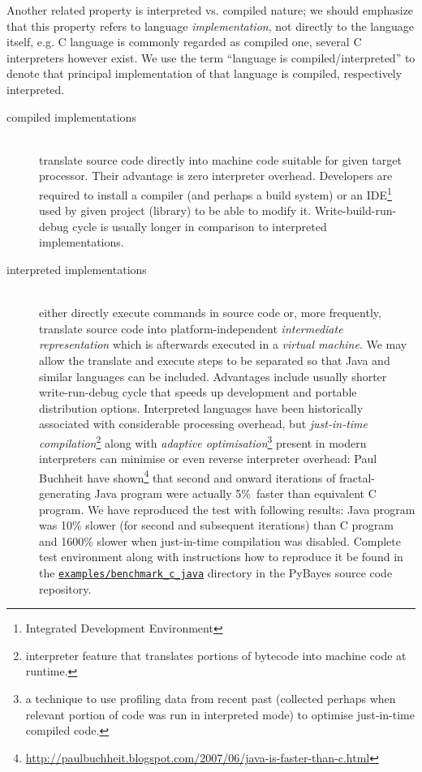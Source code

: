Another related property is interpreted vs. compiled nature; we should emphasize that this property
refers to language \emph{implementation}, not directly to the language itself, e.g. C language
is commonly regarded as compiled one, several C interpreters however exist. We use the term
``language is compiled/interpreted'' to denote that principal implementation of that language is
compiled, respectively interpreted.
\begin{description}
	\item[compiled implementations] \hfill \\
		translate source code directly into machine code suitable for given target processor. Their
		advantage is zero interpreter overhead. Developers are required to install a
		compiler (and perhaps a build system) or an IDE\footnote{Integrated Development Environment}
		used by given project (library) to be able to modify it. Write-build-run-debug cycle is
		usually longer in comparison to interpreted implementations.
	\item[interpreted implementations] \hfill \\
		either directly execute commands in source code or, more frequently, translate source code
		into platform-independent \emph{intermediate representation} which is afterwards executed in
		a \emph{virtual machine}. We may allow the translate and execute steps to be separated so that
		Java and similar languages can be included. Advantages include usually shorter
		write-run-debug cycle that speeds up development and portable distribution options.
		Interpreted languages have been historically associated with considerable processing
		overhead, but \emph{just-in-time compilation}\footnote{interpreter feature that translates
		portions of bytecode into machine code at runtime.} along with \emph{adaptive
		optimisation}\footnote{a technique to use profiling data from recent past (collected perhaps
		when relevant portion of code was run in interpreted mode) to optimise just-in-time compiled
		code.} present in modern interpreters can minimise or even reverse interpreter
		overhead: Paul Buchheit have shown\footnote{\url{http://paulbuchheit.blogspot.com/2007/06/java-is-faster-than-c.html}}
		that second and onward iterations of fractal-generating Java program were actually
		5\%~faster than equivalent C program. We have reproduced the test with following results:
		Java program was 10\% slower (for second and subsequent iterations) than C program and 1600\%
		slower when just-in-time compilation was disabled. Complete test environment along with
		instructions how to reproduce it be found in the
		\href{http://github.com/strohel/PyBayes/tree/master/examples/benchmark_c_java}{\nolinkurl{examples/benchmark_c_java}}
		directory in the PyBayes source code repository.
\end{description}
